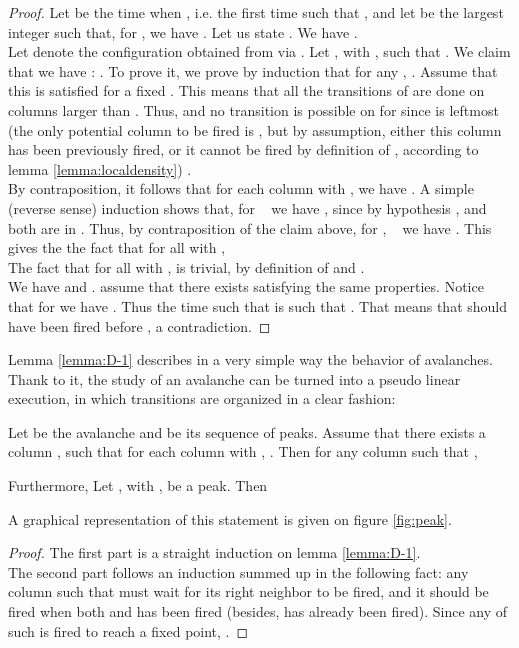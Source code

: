 \documentclass[11pt,a4paper]{llncs}
\begin{document}
\begin{proof}

 Let  be the time when , i.e. the   first  time such that ,  and let  be the largest integer such that,  for , we have .  Let us state . We have . \\
Let  denote the configuration obtained from  via . Let   , with ,  such that . We claim that we have :  . To prove it, we prove by induction that for any ,  . Assume that this is satisfied for a fixed . This means that all the transitions of   are done on columns larger than .  Thus,  and no transition is possible  on  for  since   is leftmost (the only potential column to be fired is , but by assumption, either this column has been previously fired,  or it cannot be fired by definition of , according to lemma \ref{lemma:localdensity}) . \\
By contraposition,  it follows that for each column   with ,  we have .  A   simple (reverse sense) induction shows that,   for    we have , since  by hypothesis , and  both are in .  Thus, by contraposition of the claim above,  for ,   we have . 
This gives  the the fact that for all  with , \\
The fact that for all  with ,  is trivial,  by definition of  and .\\
 We have  and . assume that there exists  satisfying the same properties. Notice that 
 for    we have . Thus the time  such that   is such that . 
  That means that   should have been fired before ,  a contradiction.
\end{proof}

Lemma \ref{lemma:D-1} describes in a very simple way the behavior of avalanches. Thank to it, the study of an avalanche can be turned into a pseudo linear execution, in which transitions are organized in a clear fashion:




\begin{theorem}\label{corollary:peak}
  Let  be the  avalanche and  be its sequence of peaks. Assume that  there exists a column ,  such that for each column   with , . 
  Then for any column  such that , 
  
  
  Furthermore, Let , with , be a peak. Then
  

 \end{theorem}

 A graphical representation of this statement is given on figure \ref{fig:peak}.

\begin{proof}
  The first part  is a straight induction on lemma \ref{lemma:D-1}.\\
  The second part follows an induction summed up in the following fact: any column  such that  must wait for its right neighbor  to be fired, and it should be fired when both  and  has been fired (besides,  has already been fired). Since any of such  is fired to reach a fixed point, .
\end{proof}
\end{document}
